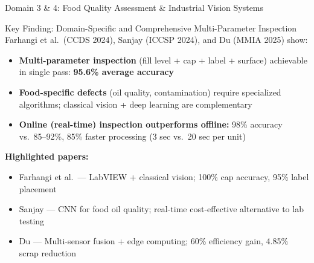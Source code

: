 \documentclass[10pt]{beamer}
\begin{document}
\begin{frame}{Domain 3 \& 4: Food Quality Assessment \& Industrial Vision Systems}

\small
\begin{block}{Key Finding: Domain-Specific and Comprehensive Multi-Parameter Inspection}
Farhangi et al.\ (CCDS 2024), Sanjay (ICCSP 2024), and Du (MMIA 2025) show:
\begin{itemize}\setlength{\itemsep}{3pt}
    \item \textbf{Multi-parameter inspection} (fill level + cap + label + surface) achievable in single pass: \textbf{95.6\% average accuracy}
    \item \textbf{Food-specific defects} (oil quality, contamination) require specialized algorithms; classical vision + deep learning are complementary
    \item \textbf{Online (real-time) inspection outperforms offline:} 98\% accuracy vs.\ 85--92\%, 85\% faster processing (3 sec vs.\ 20 sec per unit)
\end{itemize}
\end{block}

\vspace{6pt}
\textbf{Highlighted papers:}
\begin{itemize}\setlength{\itemsep}{2pt}
    \item Farhangi et al.\ — LabVIEW + classical vision; 100\% cap accuracy, 95\% label placement
    \item Sanjay — CNN for food oil quality; real-time cost-effective alternative to lab testing
    \item Du — Multi-sensor fusion + edge computing; 60\% efficiency gain, 4.85\% scrap reduction
\end{itemize}

\end{frame}
\end{document}
